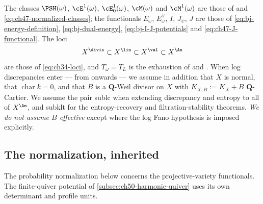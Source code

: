 The classes $\PSH(\omega)$, $\cE^1(\omega)$, $\cE^1_0(\omega)$,
$\cM(\omega)$ and $\cM^1(\omega)$ are those of
 and
\eqref{eq:ch47-normalized-classes}; the functionals $E_\omega$,
$E^\vee_\omega$, $I$, $J_\psi$, $J$ are those of
\eqref{eq:bj-energy-definition}, \eqref{eq:bj-dual-energy},
\eqref{eq:bj-I-J-potentials} and \eqref{eq:ch47-J-functional}.  The loci
\[
 X^{\divis}\subset X^{\lin}\subset X^{\val}\subset X^{\An}
\]
are those of \eqref{eq:ch34-loci}, and $T_\omega=T_L$ is the exhaustion of
 and .  When
log discrepancies enter --- from  onwards --- we
assume in addition that $X$ is normal, that
$\operatorname{char}k=0$, and that $B$ is a $\mathbf Q$-Weil divisor
on $X$ with $K_{X,B}:=K_X+B$ $\mathbf Q$-Cartier.  We assume the pair sublc when extending discrepancy and entropy to all of $X^{\An}$, and subklt for the entropy-recovery and filtration-stability theorems.  \emph{We do not
assume $B$ effective} except where the log Fano hypothesis is imposed
explicitly.

\subsection{The normalization, inherited}
\label{sec:ch50-normalization}

The probability normalization below concerns the projective-variety
functionals. The finite-quiver potential of
\cref{subsec:ch50-harmonic-quiver} uses its own determinant and profile
units.

